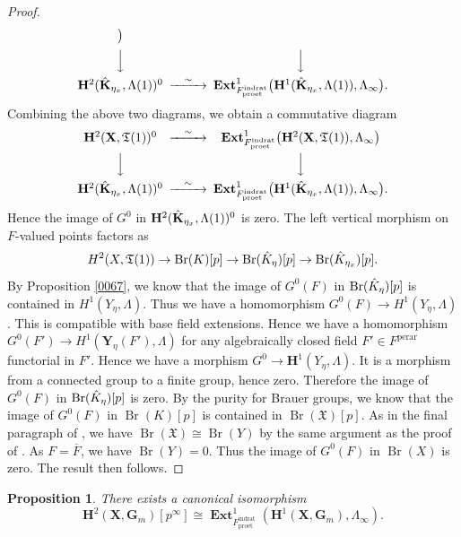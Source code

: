 \documentclass{amsart}
\newtheorem{Prop}[Thm]{Proposition}
\theoremstyle{remark}
\numberwithin{equation}{section}
\newcommand{\closure}[1]{\overline{#1}}
\newcommand{\et}{\mathrm{et}}
\newcommand{\Gm}{\mathbf{G}_{m}}
\newcommand{\rat}{\mathrm{rat}}
\newcommand{\ind}{\mathrm{ind}}
\newcommand{\pro}{\mathrm{pro}}
\newcommand{\perar}{\mathrm{perar}}
\newcommand{\alg}[1]{\mathbf{#1}}
\DeclareMathOperator{\sheafext}{\alg{Ext}}
\DeclareMathOperator{\Br}{Br}
\begin{document}
\begin{proof}
\[\begin{CD}
					\bigr)
				\\ @VVV @VVV \\
					\alg{H}^{2}(\Hat{\alg{K}}_{\eta_{x}}, \Lambda(1))^{0}
				@> \sim >>
					\sheafext^{1}_{F^{\ind\rat}_{\pro\et}} \bigl(
						\alg{H}^{1}(\Hat{\alg{K}}_{\eta_{x}}, \Lambda(1)),
						\Lambda_{\infty}
					\bigr).
			\end{CD}
		\]
	Combining the above two diagrams, we obtain a commutative diagram
		\[
			\begin{CD}
					\alg{H}^{2}(\alg{X}, \mathfrak{T}(1))^{0}
				@> \sim >>
					\sheafext^{1}_{F^{\ind\rat}_{\pro\et}} \bigl(
						\alg{H}^{2}(\alg{X}, \mathfrak{T}(1)),
						\Lambda_{\infty}
					\bigr)
				\\ @VVV @VVV \\
					\alg{H}^{2}(\Hat{\alg{K}}_{\eta_{x}}, \Lambda(1))^{0}
				@> \sim >>
					\sheafext^{1}_{F^{\ind\rat}_{\pro\et}} \bigl(
						\alg{H}^{1}(\Hat{\alg{K}}_{\eta_{x}}, \Lambda(1)),
						\Lambda_{\infty}
					\bigr).
			\end{CD}
		\]
	Hence the image of $G^{0}$ in $\alg{H}^{2}(\Hat{\alg{K}}_{\eta_{x}}, \Lambda(1))^{0}$ is zero.
	The left vertical morphism on $F$-valued points factors as
		\[
				H^{2}(X, \mathfrak{T}(1))
			\to
				\Br(K)[p]
			\to
				\Br(\Hat{K}_{\eta})[p]
			\to
				\Br(\Hat{K}_{\eta_{x}})[p].
		\]
	By Proposition \ref{0067}, we know that the image of $G^{0}(F)$ in $\Br(\Hat{K}_{\eta})[p]$
	is contained in $H^{1}(Y_{\eta}, \Lambda)$.
	Thus we have a homomorphism
	$G^{0}(F) \to H^{1}(Y_{\eta}, \Lambda)$.
	This is compatible with base field extensions.
	Hence we have a homomorphism
	$G^{0}(F') \to H^{1}(\alg{Y}_{\eta}(F'), \Lambda)$
	for any algebraically closed field $F' \in F^{\perar}$
	functorial in $F'$.
	Hence we have a morphism
	$G^{0} \to \alg{H}^{1}(Y_{\eta}, \Lambda)$.
	It is a morphism from a connected group to a finite group,
	hence zero.
	Therefore the image of $G^{0}(F)$ in $\Br(\Hat{K}_{\eta})[p]$ is zero.
	By the purity for Brauer groups,
	we know that the image of $G^{0}(F)$ in $\Br(K)[p]$ is contained in $\Br(\mathfrak{X})[p]$.
	As in the final paragraph of \cite[Section 3]{Sai86},
	we have $\Br(\mathfrak{X}) \cong \Br(Y)$ by the same argument as the proof of
	\cite[Theorem (3.1)]{Gro68}.
	As $F = \closure{F}$, we have $\Br(Y) = 0$.
	Thus the image of $G^{0}(F)$ in $\Br(X)$ is zero.
	The result then follows.
\end{proof}

\begin{Prop}
	There exists a canonical isomorphism
		\[
				\alg{H}^{2}(\alg{X}, \Gm)[p^{\infty}]
			\cong
				\sheafext^{1}_{F^{\ind\rat}_{\pro\et}}(\alg{H}^{1}(\alg{X}, \Gm), \Lambda_{\infty}).
		\]
\end{Prop}
\end{document}
